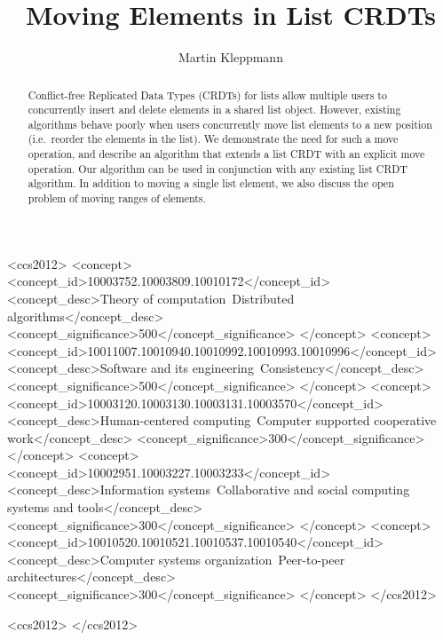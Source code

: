 \documentclass[sigplan,10pt]{acmart}
\begin{document}
\title{Moving Elements in List CRDTs}

\author{Martin Kleppmann}

\begin{abstract}
Conflict-free Replicated Data Types (CRDTs) for lists allow multiple users to concurrently insert and delete elements in a shared list object.
However, existing algorithms behave poorly when users concurrently move list elements to a new position (i.e.\ reorder the elements in the list).
We demonstrate the need for such a move operation, and describe an algorithm that extends a list CRDT with an explicit move operation.
Our algorithm can be used in conjunction with any existing list CRDT algorithm.
In addition to moving a single list element, we also discuss the open problem of moving ranges of elements.
\end{abstract}

\begin{CCSXML}
<ccs2012>
    <concept>
        <concept_id>10003752.10003809.10010172</concept_id>
        <concept_desc>Theory of computation~Distributed algorithms</concept_desc>
        <concept_significance>500</concept_significance>
    </concept>
    <concept>
        <concept_id>10011007.10010940.10010992.10010993.10010996</concept_id>
        <concept_desc>Software and its engineering~Consistency</concept_desc>
        <concept_significance>500</concept_significance>
    </concept>
    <concept>
        <concept_id>10003120.10003130.10003131.10003570</concept_id>
        <concept_desc>Human-centered computing~Computer supported cooperative work</concept_desc>
        <concept_significance>300</concept_significance>
    </concept>
    <concept>
        <concept_id>10002951.10003227.10003233</concept_id>
        <concept_desc>Information systems~Collaborative and social computing systems and tools</concept_desc>
        <concept_significance>300</concept_significance>
    </concept>
    <concept>
        <concept_id>10010520.10010521.10010537.10010540</concept_id>
        <concept_desc>Computer systems organization~Peer-to-peer architectures</concept_desc>
        <concept_significance>300</concept_significance>
    </concept>
</ccs2012>
\end{CCSXML}

\begin{CCSXML}
<ccs2012>
 </ccs2012>
\end{CCSXML}
\end{document}
